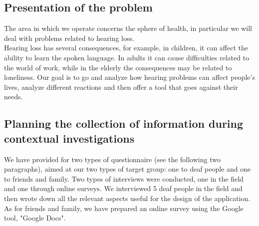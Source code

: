\lhead{}
\subsection{Presentation of the problem}
The area in which we operate concerns the sphere of health, in particular we will deal with problems related to hearing loss.\\
Hearing loss has several consequences, for example, in children, it can affect the ability to learn the spoken language. In adults it can cause difficulties related to the world of work, while in the elderly the consequences may be related to loneliness. Our goal is to go and analyze how hearing problems can affect people's lives, analyze different reactions and then offer a tool that goes against their needs.

\subsection{Planning the collection of information during contextual investigations}


We have provided for two types of questionnaire (see the following two paragraphs), aimed at our two types of target group: one to deaf people and one to friends and family. Two types of interviews were conducted, one in the field and one through online surveys. We interviewed 5 deaf people in the field and then wrote down all the relevant aspects useful for the design of the application. As for friends and family, we have prepared an online survey using the Google tool, "Google Docs".

